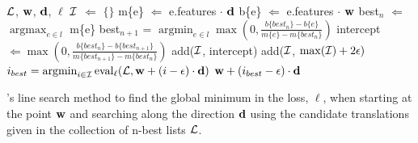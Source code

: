 \documentclass[11pt,tightenlines,kern-1pt]{article}
\DeclareMathOperator*{\argmax}{argmax}
\DeclareMathOperator*{\argmin}{argmin}
\DeclareMathOperator*{\eval}{eval}
\begin{document}
\begin{algorithm}[tb]
\begin{algorithmic}
    \mbox{${\cal L}$}, \mbox{${\bf w}$}, \mbox{${\bf d}$}, $\ell$ 
   \STATE \mbox{${\cal I}$} \mbox{$\Leftarrow$} \mbox{$\{\}$}
         \STATE m\{e\} \mbox{$\Leftarrow$} e.features \mbox{$\cdot$} \mbox{${\bf d}$}
         \STATE b\{e\} \mbox{$\Leftarrow$} e.features \mbox{$\cdot$} \mbox{${\bf w}$}
     \ENDFOR
     \STATE best\mbox{$_n$} \mbox{$\Leftarrow$} \mbox{$\argmax_{e\in l}$} m\{e\}
     \LOOP
       \STATE best\mbox{$_{n+1}$} = $\argmin_{e\in l}
                  \max\left(0,\frac{b\{best_n\}-b\{e\}}{m\{e\}-m\{best_n\}}\right )$
       \STATE intercept \mbox{$\Leftarrow \max\left(0,\frac{b\{best_n\}-b\{best_{n+1}\}}{m\{best_{n+1}\}-m\{best_n\}}\right )$}
         \STATE add(\mbox{${\cal I}$}, intercept)
       \ELSE
       \ENDIF
     \ENDLOOP
   \ENDFOR
   \STATE add(\mbox{${\cal I}$}, \mbox{$\max({\cal I})+2\epsilon)$}
   \STATE \mbox{$i_{best} = \argmin_{i \in {\cal I}} \eval_\ell({\cal L},{\bf w}+(i-\epsilon) \cdot {\bf d})$}
    \mbox{${\bf w}+(i_{best}-\epsilon) \cdot {\bf d}$}
\caption{
's line search method to find the global minimum in the loss, \mbox{${\ell}$}, when starting at the point \mbox{${\bf w}$} and searching along the direction \mbox{${\bf d}$} using the candidate translations given in the collection of n-best lists \mbox{${\cal L}$}.
\label{mertlinesearchalg}
}
\end{algorithmic}
\end{algorithm}
\end{document}
